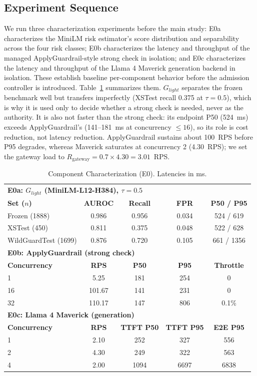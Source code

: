 \documentclass[conference]{IEEEtran}
\newcommand{\Glight}{G_{\mathit{light}}}
\begin{document}
\subsection{Experiment Sequence}

We run three characterization experiments before the main study: E0a characterizes the MiniLM risk estimator's score distribution and separability across the four risk classes; E0b characterizes the latency and throughput of the managed ApplyGuardrail-style strong check in isolation; and E0c characterizes the latency and throughput of the Llama 4 Maverick generation backend in isolation. These establish baseline per-component behavior before the admission controller is introduced. Table~\ref{tab:e0} summarizes them. $\Glight$ separates the frozen benchmark well but transfers imperfectly (XSTest recall 0.375 at $\tau=0.5$), which is why it is used only to decide whether a strong check is needed, never as the authority. It is also not faster than the strong check: its endpoint P50 (524~ms) exceeds ApplyGuardrail's (141--181~ms at concurrency $\le 16$), so its role is cost reduction, not latency reduction. ApplyGuardrail sustains about 100~RPS before P95 degrades, whereas Maverick saturates at concurrency 2 (4.30~RPS); we set the gateway load to $R_{\text{gateway}} = 0.7 \times 4.30 = 3.01$~RPS.

\begin{table}[t]
\caption{Component Characterization (E0). Latencies in ms.}
\label{tab:e0}
\centering
\scriptsize
\setlength{\tabcolsep}{3pt}
\begin{tabular}{lcccc}
\toprule
\multicolumn{5}{l}{\textbf{E0a: $\Glight$ (MiniLM-L12-H384), $\tau=0.5$}} \\
\textbf{Set ($n$)} & \textbf{AUROC} & \textbf{Recall} & \textbf{FPR} & \textbf{P50 / P95} \\
\midrule
Frozen (1888) & 0.986 & 0.956 & 0.034 & 524 / 619 \\
XSTest (450) & 0.811 & 0.375 & 0.048 & 522 / 628 \\
WildGuardTest (1699) & 0.876 & 0.720 & 0.105 & 661 / 1356 \\
\midrule
\multicolumn{5}{l}{\textbf{E0b: ApplyGuardrail (strong check)}} \\
\textbf{Concurrency} & \textbf{RPS} & \textbf{P50} & \textbf{P95} & \textbf{Throttle} \\
\midrule
1 & 5.25 & 181 & 254 & 0 \\
16 & 101.67 & 141 & 231 & 0 \\
32 & 110.17 & 147 & 806 & 0.1\% \\
\midrule
\multicolumn{5}{l}{\textbf{E0c: Llama 4 Maverick (generation)}} \\
\textbf{Concurrency} & \textbf{RPS} & \textbf{TTFT P50} & \textbf{TTFT P95} & \textbf{E2E P95} \\
\midrule
1 & 2.10 & 252 & 327 & 556 \\
2 & 4.30 & 249 & 322 & 563 \\
4 & 2.00 & 1094 & 6697 & 6838 \\
\bottomrule
\end{tabular}
\end{table}
\end{document}
